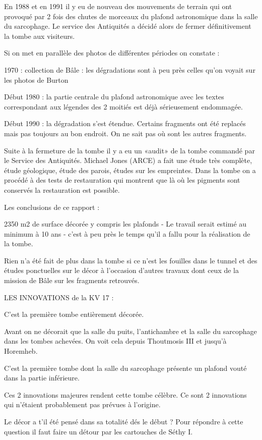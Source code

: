\documentclass{article}
\begin{document}
En 1988 et en 1991 il y eu de nouveau des mouvements de terrain qui ont
provoqué par 2 fois des chutes de morceaux du plafond astronomique dans
la salle du sarcophage. Le service des Antiquités a décidé alors de
fermer définitivement la tombe aux visiteurs.

Si on met en parallèle des photos de différentes périodes on constate : 

1970 : collection de Bâle : les dégradations sont à peu près celles
qu’on voyait sur les photos de Burton

Début 1980 : la partie centrale du plafond astronomique avec les textes
correspondant aux légendes des 2 moitiés est déjà sérieusement
endommagée.

Début 1990 : la dégradation s’est étendue. Certains fragments ont été
replacés mais pas toujours au bon endroit. On ne sait pas où sont les
autres fragments.

Suite à la fermeture de la tombe il y a eu un «audit» de la tombe
commandé par le Service des Antiquités. Michael Jones (ARCE) a fait une
étude très complète, étude géologique, étude des parois, études sur les
empreintes. Dans la tombe on a procédé à des tests de restauration qui
montrent que là où les pigments sont conservés la restauration est
possible. 

Les conclusions de ce rapport :

 2350 m2 de surface décorée y compris les plafonds {}- Le travail serait
estimé au minimum à 10 ans {}- c’est à peu près le temps qu’il a fallu
pour la réalisation de la tombe. 

Rien n’a été fait de plus dans la tombe si ce n’est les fouilles dans le
tunnel et des études ponctuelles sur le décor à l’occasion d’autres
travaux dont ceux de la mission de Bâle sur les fragments retrouvés.

LES INNOVATIONS de la KV 17 :

C’est la première tombe entièrement décorée. 

Avant on ne décorait que la salle du puits, l’antichambre et la salle du
sarcophage dans les tombes achevées. On voit cela depuis Thoutmosis III
et jusqu’à Horemheb.

C’est la première tombe dont la salle du sarcophage présente un plafond
vouté dans la partie inférieure. 

Ces 2 innovations majeures rendent cette tombe célèbre. Ce sont 2
innovations qui n’étaient probablement pas prévues à l’origine.

Le décor a t’il été pensé dans sa totalité dés le début ? Pour répondre
à cette question il faut faire un détour par les cartouches de Séthy I.
\end{document}
